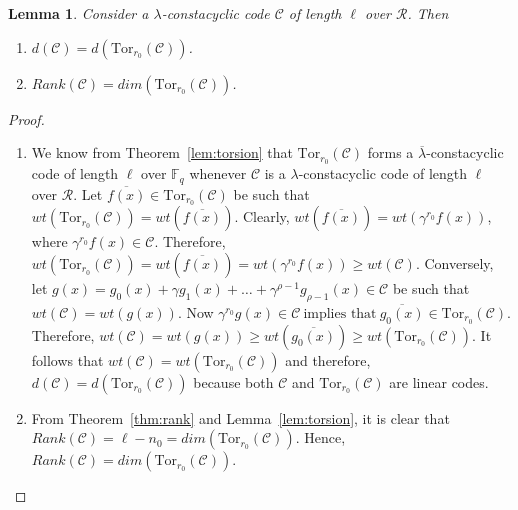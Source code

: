 \documentclass[12pt,a4paper]{article}
\newtheorem{lemma}[theorem]{Lemma}
\begin{document}
\begin{lemma}\label{lem:distance}
    Consider a $\lambda$-constacyclic code $\mathcal{C}$ of length $\ell$ over $\mathcal{R}$. Then
    \begin{enumerate}
        \item $d(\mathcal{C})=d(\mathrm{Tor}_{r_0}(\mathcal{C}))$.
        \item $Rank(\mathcal{C})=dim(\mathrm{Tor}_{r_0}(\mathcal{C}))$.
    \end{enumerate}
\end{lemma}
\begin{proof}
    \begin{enumerate}
        \item We know from Theorem~\ref{lem:torsion} that $\mathrm{Tor}_{r_0}(\mathcal{C})$ forms a $\overline{\lambda}$-constacyclic code of length $\ell$ over $\mathbb{F}_q$ whenever $\mathcal{C}$ is a $\lambda$-constacyclic code of length $\ell$ over $\mathcal{R}$. Let $\overline{f(x)} \in \mathrm{Tor}_{r_0}(\mathcal{C})$ be such that $wt(\mathrm{Tor}_{r_0}(\mathcal{C}))=wt(\overline{f(x)})$. Clearly, $wt(\overline{f(x)})=wt(\gamma^{r_0}f(x))$, where $\gamma^{r_0}f(x) \in \mathcal{C}$. Therefore, $wt(\mathrm{Tor}_{r_0}(\mathcal{C}))=wt(\overline{f(x)})=wt(\gamma^{r_0}f(x))\ge wt(\mathcal{C})$. Conversely, let $g(x)=g_0(x)+\gamma g_1(x)+ \dots +\gamma^{\rho-1}g_{\rho-1}(x) \in \mathcal{C}$ be such that $wt(\mathcal{C})=wt(g(x))$. Now $\gamma^{r_0}g(x) \in \mathcal{C}~\text{implies that}~ \overline{g_0(x)} \in \mathrm{Tor}_{r_0}(\mathcal{C})$. Therefore, $wt(\mathcal{C})=wt(g(x)) \ge wt(\overline{g_0(x)}) \ge wt(\mathrm{Tor}_{r_0}(\mathcal{C}))$. It follows that $wt(\mathcal{C})=wt(\mathrm{Tor}_{r_0}(\mathcal{C}))$ and therefore, $d(\mathcal{C})=d(\mathrm{Tor}_{r_0}(\mathcal{C}))$ because both $\mathcal{C}$ and $\mathrm{Tor}_{r_0}(\mathcal{C})$ are linear codes.
        \item From Theorem~\ref{thm:rank} and Lemma~\ref{lem:torsion}, it is clear that $Rank(\mathcal{C})=\ell-n_0=dim(\mathrm{Tor}_{r_0}(\mathcal{C}))$. Hence, $Rank(\mathcal{C})=dim(\mathrm{Tor}_{r_0}(\mathcal{C}))$.
    \end{enumerate}
\end{proof}
\end{document}
